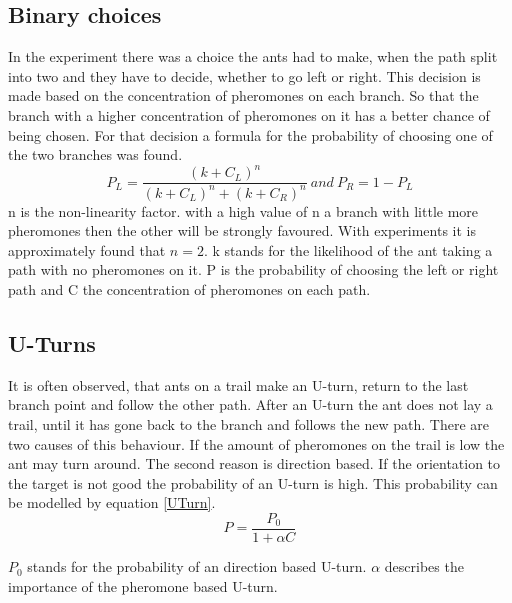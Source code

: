  \subsection{Binary choices}
 In the experiment there was a choice the ants had to make, when the path split into two and they have to decide, whether to go left or right. This decision is made based on the concentration of pheromones on each branch. So that the branch with a higher concentration of pheromones on it has a better chance of being chosen. For that decision a formula for the probability of choosing one of the two branches was found.
  \begin{equation} \label{binaryChoice}
 P_L = \frac{(k+C_L)^n}{(k+C_L)^n+(k+C_R)^n} \ and \  P_R = 1-P_L
 \end{equation}
 n is the non-linearity factor. with a high value of n a branch with little more pheromones then the other will be strongly favoured. With experiments it is approximately found that $n=2$. k stands for the likelihood of the ant taking a path with no pheromones on it. P is the probability of choosing the left or right path and C the concentration of pheromones on each path. 
 \subsection{U-Turns}
 It is often observed, that ants on a trail make an U-turn, return to the last branch point and follow the other path. After an U-turn the ant does not lay a trail, until it has gone back to the branch and follows the new path. There are two causes of this behaviour. If the amount of pheromones on the trail is low the ant may turn around. The second reason is direction based. If the orientation to the target is not good the probability of an U-turn is high. This probability can be modelled by equation \ref{UTurn}. \citep{camazine2003}
\begin{equation} \label{UTurn}
 P=\frac{P_0}{1+\alpha C}
\end{equation}

$P_0$ stands for the probability of an direction based U-turn. $\alpha$ describes the importance of the pheromone based U-turn.
